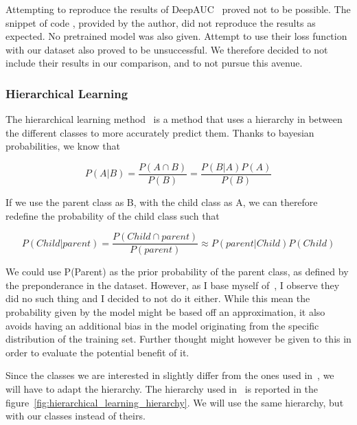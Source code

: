 \documentclass[11pt]{article}
\begin{document}
            Attempting to reproduce the results of DeepAUC~\cite{DeepAUC} proved not to be possible. The snippet of code , provided by the author,
            did not reproduce the results as expected. No pretrained model was also given. Attempt to use their loss function with our dataset also proved
            to be unsuccessful. We therefore decided to not include their results in our comparison, and to not pursue this avenue.

        \subsubsection{Hierarchical Learning~\cite{hierarchical}}

            The hierarchical learning method~\cite{hierarchical} is a method that uses a hierarchy in between the different classes
            to more accurately predict them. Thanks to bayesian probabilities, we know that

            \begin{equation}
                P(A|B) = \frac{P(A \cap B)}{P(B)} = \frac{P(B|A) P(A)}{P(B)}
            \end{equation}

            If we use the parent class as B, with the child class as A, we can therefore redefine
            the probability of the child class such that

            \begin{equation}
                P(Child|parent) = \frac{P(Child \cap parent)}{P(parent)} \approx P(parent|Child) P(Child)
            \end{equation}

            We could use P(Parent) as the prior probability of the parent class, as defined by the preponderance in the dataset. However, as I base myself of~\cite{hierarchical}, I observe they did no such thing and I decided to not do it either. While this mean the probability given by the model might be based off an approximation,
            it also avoids having an additional bias in the model originating from the specific distribution of the training set. Further thought might however be given to this in order to evaluate the potential benefit of it.

            Since the classes we are interested in slightly differ from the ones used in~\cite{hierarchical},
            we will have to adapt the hierarchy. The hierarchy used in~\cite{hierarchical} is reported in the figure~\ref{fig:hierarchical_learning_hierarchy}. We will use the same hierarchy, but with our classes instead of theirs.
\end{document}
